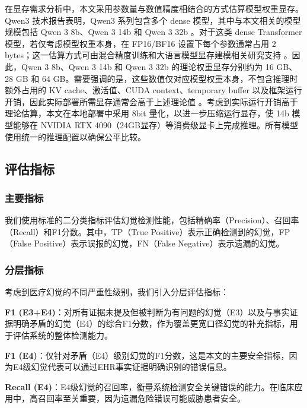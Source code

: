 \documentclass[11pt]{article}
\begin{document}
在显存需求分析中，本文采用参数量与数值精度相结合的方式估算模型权重显存。Qwen3 技术报告表明，Qwen3 系列包含多个 dense 模型，其中与本文相关的模型规模包括 Qwen 3 8b、Qwen 3 14b 和 Qwen 3 32b \citep{yang2025qwen3TechnicalReport}。对于这类 dense Transformer 模型，若仅考虑模型权重本身，在 FP16/BF16 设置下每个参数通常占用 2 bytes；这一估算方式可由混合精度训练和大语言模型显存建模相关研究支持 \citep{micikevicius2018mixedPrecision,fujii2024memoryConsumptionEstimator,kim2024llmem}。因此，Qwen 3 8b、Qwen 3 14b 和 Qwen 3 32b 的理论权重显存分别约为 16 GB、28 GB 和 64 GB。需要强调的是，这些数值仅对应模型权重本身，不包含推理时额外占用的 KV cache、激活值、CUDA context、temporary buffer 以及框架运行开销，因此实际部署所需显存通常会高于上述理论值 \citep{fujii2024memoryConsumptionEstimator,kim2024llmem}。考虑到实际运行开销高于理论估算，本文在本地部署中采用 8bit 量化，以进一步压缩运行显存，使 14b 模型能够在 NVIDIA RTX 4090（24GB显存）等消费级显卡上完成推理。所有模型使用统一的推理配置以确保公平比较。

\subsection{评估指标}

\subsubsection{主要指标}

我们使用标准的二分类指标评估幻觉检测性能，包括精确率（Precision）、召回率（Recall）和F1分数。其中，TP（True Positive）表示正确检测到的幻觉，FP（False Positive）表示误报的幻觉，FN（False Negative）表示遗漏的幻觉。

\subsubsection{分层指标}

考虑到医疗幻觉的不同严重性级别，我们引入分层评估指标：

\textbf{F1 (E3+E4)}：对所有证据未提及但被判断为有问题的幻觉（E3）以及与事实证据明确矛盾的幻觉（E4）的综合F1分数，作为覆盖更宽口径幻觉的补充指标，用于评估系统的整体检测能力。

\textbf{F1 (E4)}：仅针对矛盾（E4）级别幻觉的F1分数，这是本文的主要安全指标，因为E4级幻觉代表可以通过EHR事实证据明确识别的错误信息。

\textbf{Recall (E4)}：E4级幻觉的召回率，衡量系统检测安全关键错误的能力。在临床应用中，高召回率至关重要，因为遗漏危险错误可能威胁患者安全。
\end{document}
